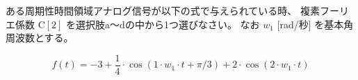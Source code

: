 ある周期性時間領域アナログ信号が以下の式で与えられている時、
複素フーリエ係数 $\textrm{C}[2]$ を選択肢a〜dの中から1つ選びなさい。
なお $w_1$ [rad/秒] を基本角周波数とする。

\[
f(t) = 
-3
+ \frac{1}{4} \cdot \cos( 1 \cdot w_1 \cdot t + \pi/3 )
+ 2 \cdot \cos( 2 \cdot w_1 \cdot t )
\]
